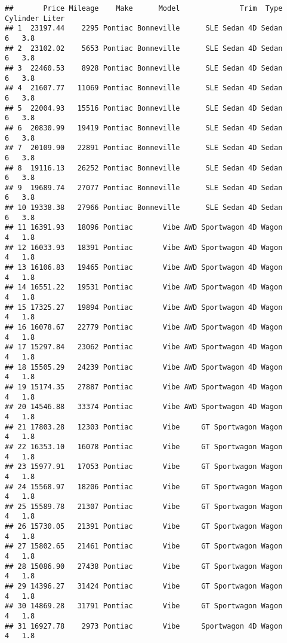 \documentclass[
]{article}
\begin{document}
\begin{verbatim}
##       Price Mileage    Make      Model              Trim  Type Cylinder Liter
## 1  23197.44    2295 Pontiac Bonneville      SLE Sedan 4D Sedan        6   3.8
## 2  23102.02    5653 Pontiac Bonneville      SLE Sedan 4D Sedan        6   3.8
## 3  22460.53    8928 Pontiac Bonneville      SLE Sedan 4D Sedan        6   3.8
## 4  21607.77   11069 Pontiac Bonneville      SLE Sedan 4D Sedan        6   3.8
## 5  22004.93   15516 Pontiac Bonneville      SLE Sedan 4D Sedan        6   3.8
## 6  20830.99   19419 Pontiac Bonneville      SLE Sedan 4D Sedan        6   3.8
## 7  20109.90   22891 Pontiac Bonneville      SLE Sedan 4D Sedan        6   3.8
## 8  19116.13   26252 Pontiac Bonneville      SLE Sedan 4D Sedan        6   3.8
## 9  19689.74   27077 Pontiac Bonneville      SLE Sedan 4D Sedan        6   3.8
## 10 19338.38   27966 Pontiac Bonneville      SLE Sedan 4D Sedan        6   3.8
## 11 16391.93   18096 Pontiac       Vibe AWD Sportwagon 4D Wagon        4   1.8
## 12 16033.93   18391 Pontiac       Vibe AWD Sportwagon 4D Wagon        4   1.8
## 13 16106.83   19465 Pontiac       Vibe AWD Sportwagon 4D Wagon        4   1.8
## 14 16551.22   19531 Pontiac       Vibe AWD Sportwagon 4D Wagon        4   1.8
## 15 17325.27   19894 Pontiac       Vibe AWD Sportwagon 4D Wagon        4   1.8
## 16 16078.67   22779 Pontiac       Vibe AWD Sportwagon 4D Wagon        4   1.8
## 17 15297.84   23062 Pontiac       Vibe AWD Sportwagon 4D Wagon        4   1.8
## 18 15505.29   24239 Pontiac       Vibe AWD Sportwagon 4D Wagon        4   1.8
## 19 15174.35   27887 Pontiac       Vibe AWD Sportwagon 4D Wagon        4   1.8
## 20 14546.88   33374 Pontiac       Vibe AWD Sportwagon 4D Wagon        4   1.8
## 21 17803.28   12303 Pontiac       Vibe     GT Sportwagon Wagon        4   1.8
## 22 16353.10   16078 Pontiac       Vibe     GT Sportwagon Wagon        4   1.8
## 23 15977.91   17053 Pontiac       Vibe     GT Sportwagon Wagon        4   1.8
## 24 15568.97   18206 Pontiac       Vibe     GT Sportwagon Wagon        4   1.8
## 25 15589.78   21307 Pontiac       Vibe     GT Sportwagon Wagon        4   1.8
## 26 15730.05   21391 Pontiac       Vibe     GT Sportwagon Wagon        4   1.8
## 27 15802.65   21461 Pontiac       Vibe     GT Sportwagon Wagon        4   1.8
## 28 15086.90   27438 Pontiac       Vibe     GT Sportwagon Wagon        4   1.8
## 29 14396.27   31424 Pontiac       Vibe     GT Sportwagon Wagon        4   1.8
## 30 14869.28   31791 Pontiac       Vibe     GT Sportwagon Wagon        4   1.8
## 31 16927.78    2973 Pontiac       Vibe     Sportwagon 4D Wagon        4   1.8

\end{verbatim}
\end{document}
